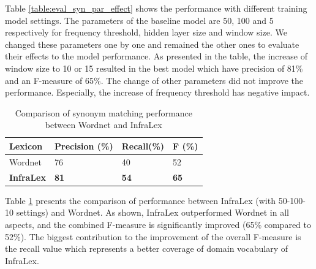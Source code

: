 \documentclass[Journal, InsideFigs, DoubleSpace]{ascelike} %
\begin{document}
Table \ref{table:eval_syn_par_effect} shows the performance with different training model settings. The parameters of the baseline model are 50, 100 and 5 respectively for frequency threshold, hidden layer size and window size. We changed these parameters one by one and remained the other ones to evaluate their effects to the model performance. As presented in the table, the increase of window size to 10 or 15 resulted in the best model which have precision of 81\% and an F-measure of 65\%. The change of other parameters did not improve the performance. Especially, the increase of frequency threshold has negative impact. 
%
\begin{table} [b] 
	\caption{Comparison of synonym matching performance between Wordnet and InfraLex}
	\label{table:eval_syn_vs_Wordnet}
	\centering
	\small
	\renewcommand{\arraystretch}{1.25}
	\begin{tabular}{l l l l }
		\hline
		\hline
		\textbf{Lexicon} & \textbf{Precision (\%)}  & \textbf{Recall(\%)} & \textbf{F (\%)}\\
		\hline
		Wordnet	&76 	&40 	&52\\	
		\textbf{InfraLex} &\textbf{81}	&\textbf{54}		&\textbf{65}\\	
		\hline
		\hline
	\end{tabular}
	\normalsize
\end{table}
\par
Table \ref{table:eval_syn_vs_Wordnet} presents the comparison of performance between InfraLex (with 50-100-10 settings) and Wordnet. As shown, InfraLex outperformed Wordnet in all aspects, and the combined F-measure is significantly improved (65\% compared to 52\%). The biggest contribution to the improvement of the overall F-measure is the recall value which represents a better coverage of domain vocabulary of InfraLex. 
\end{document}
